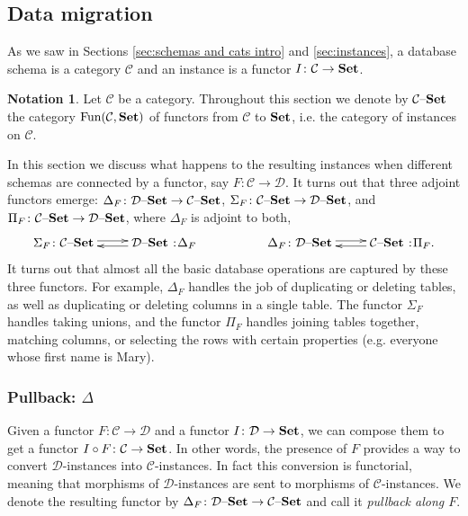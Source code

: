 \documentclass{book}
\makeatletter
\def\tn{\textnormal}
\def\mc{\mathcal}
\def\Fun{\tn{Fun}}
\def\to{\rightarrow}
\def\taking{\colon}
\newcommand{\adjoint}[4]{\xymatrix{#1\taking #2\ar@<.5ex>[r]& #3\hspace{1pt}:\hspace{-2pt} #4\ar@<.5ex>[l]}}
\def\Set{{\bf Set}}
\def\set{{\text \textendash}{\bf Set}}
\def\mcC{\mc{C}}
\def\mcD{\mc{D}}
\theoremstyle{remark}
\theoremstyle{definition}
\newtheorem{notation}[subsubsection]{Notation}
\makeatother
\begin{document}

\subsection{Data migration}\label{sec:data migration}

As we saw in Sections \ref{sec:schemas and cats intro} and \ref{sec:instances}, a database schema is a category $\mcC$ and an instance is a functor $I\taking\mcC\to\Set$.  

\begin{notation}

Let $\mcC$ be a category. Throughout this section we denote by $\mcC\set$ the category $\Fun(\mcC,\Set)$ of functors from $\mcC$ to $\Set$, i.e. the category of instances on $\mcC$. 

\end{notation}

In this section we discuss what happens to the resulting instances when different schemas are connected by a functor, say $F\taking\mcC\to\mcD$. It turns out that three adjoint functors emerge: $\Delta_F\taking\mcD\set\to\mcC\set$, $\Sigma_F\taking\mcC\set\to\mcD\set$, and $\Pi_F\taking\mcC\set\to\mcD\set$, where $\Delta_F$ is adjoint to both, 
$$
\adjoint{\Sigma_F}{\mcC\set}{\mcD\set}{\Delta_F}
\hspace{.7in}
\adjoint{\Delta_F}{\mcD\set}{\mcC\set}{\Pi_F.}
$$
It turns out that almost all the basic database operations are captured by these three functors. For example, $\Delta_F$ handles the job of duplicating or deleting tables, as well as duplicating or deleting columns in a single table. The functor $\Sigma_F$ handles taking unions, and the functor $\Pi_F$ handles joining tables together, matching columns, or selecting the rows with certain properties (e.g. everyone whose first name is Mary).


\subsubsection{Pullback: $\Delta$}

Given a functor $F\taking\mcC\to\mcD$ and a functor $I\taking\mcD\to\Set$, we can compose them to get a functor $I\circ F\taking\mcC\to\Set$. In other words, the presence of $F$ provides a way to convert $\mcD$-instances into $\mcC$-instances. In fact this conversion is functorial, meaning that morphisms of $\mcD$-instances are sent to morphisms of $\mcC$-instances. We denote the resulting functor by $\Delta_F\taking\mcD\set\to\mcC\set$ and call it {\em pullback along $F$}.
\end{document}
